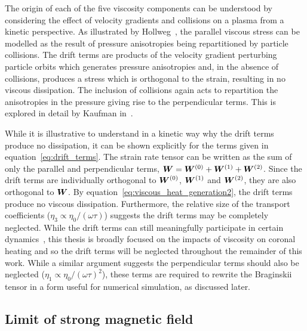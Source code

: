 The origin of each of the five viscosity components can be understood by considering the effect of velocity gradients and collisions on a plasma from a kinetic perspective. As illustrated by Hollweg~\cite{hollwegViscosityMagnetizedPlasma1985}, the parallel viscous stress can be modelled as the result of pressure anisotropies being repartitioned by particle collisions. The drift terms are products of the velocity gradient perturbing particle orbits which generates pressure anisotropies and, in the absence of collisions, produces a stress which is orthogonal to the strain, resulting in no viscous dissipation. The inclusion of collisions again acts to repartition the anisotropies in the pressure giving rise to the perpendicular terms. This is explored in detail by Kaufman in~\cite{kaufmanPlasmaViscosityMagnetic1960}.

While it is illustrative to understand in a kinetic way why the drift terms produce no dissipation, it can be shown explicitly for the terms given in equation~\ref{eq:drift_terms}. The strain rate tensor can be written as the sum of only the parallel and perpendicular terms, ${\bm W} = {\bm W}^{(0)} + {\bm W}^{(1)} + {\bm W}^{(2)}$. Since the drift terms are individually orthogonal to ${\bm W}^{(0)}$, ${\bm W}^{(1)}$ and ${\bm W}^{(2)}$, they are also orthogonal to ${\bm W}$. By equation~\ref{eq:viscous_heat_generation2}, the drift terms produce no viscous dissipation. Furthermore, the relative size of the transport coefficients ($\eta_3 \propto \eta_0/(\omega\tau)$) suggests the drift terms may be completely neglected. While the drift terms can still meaningfully participate in certain dynamics~\cite{dellarPlanarChannelFlow2011,ferraroFiniteElementImplementation2006}, this thesis is broadly focused on the impacts of viscosity on coronal heating and so the drift terms will be neglected throughout the remainder of this work. While a similar argument suggests the perpendicular terms should also be neglected ($\eta_1 \propto \eta_0/(\omega\tau)^2$), these terms are required to rewrite the Braginskii tensor in a form useful for numerical simulation, as discussed later.

\subsection{Limit of strong magnetic field}


